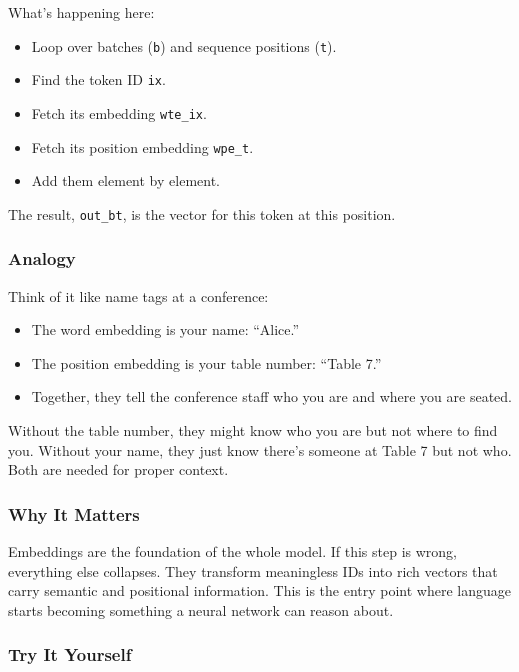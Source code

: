 \documentclass[
  letterpaper,
  DIV=11,
  numbers=noendperiod]{scrreprt}
\providecommand{\tightlist}{%
  \setlength{\itemsep}{0pt}\setlength{\parskip}{0pt}}
\begin{document}
What's happening here:

\begin{itemize}
\tightlist
\item
  Loop over batches (\texttt{b}) and sequence positions (\texttt{t}).
\item
  Find the token ID \texttt{ix}.
\item
  Fetch its embedding \texttt{wte\_ix}.
\item
  Fetch its position embedding \texttt{wpe\_t}.
\item
  Add them element by element.
\end{itemize}

The result, \texttt{out\_bt}, is the vector for this token at this
position.

\subsubsection{Analogy}\label{analogy}

Think of it like name tags at a conference:

\begin{itemize}
\tightlist
\item
  The word embedding is your name: ``Alice.''
\item
  The position embedding is your table number: ``Table 7.''
\item
  Together, they tell the conference staff who you are and where you are
  seated.
\end{itemize}

Without the table number, they might know who you are but not where to
find you. Without your name, they just know there's someone at Table 7
but not who. Both are needed for proper context.

\subsubsection{Why It Matters}\label{why-it-matters-19}

Embeddings are the foundation of the whole model. If this step is wrong,
everything else collapses. They transform meaningless IDs into rich
vectors that carry semantic and positional information. This is the
entry point where language starts becoming something a neural network
can reason about.

\subsubsection{Try It Yourself}\label{try-it-yourself-21}
\end{document}
